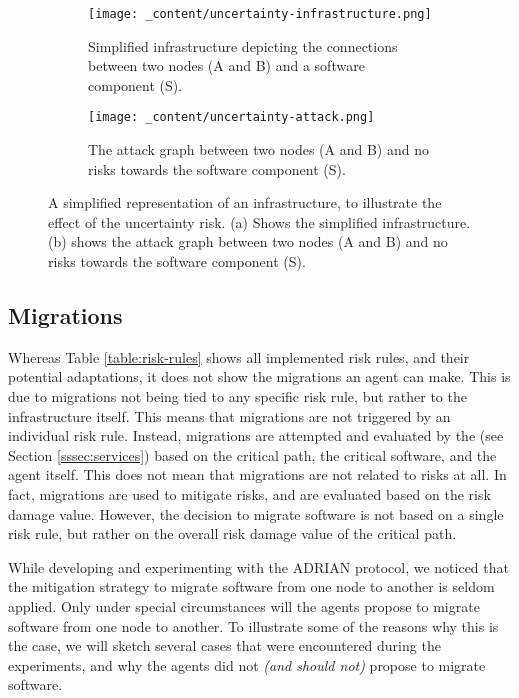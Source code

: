 \begin{figure}
    \begin{subfigure}[b]{0.47\textwidth}
        \centering
        \texttt{[image: \_content/uncertainty-infrastructure.png]}
        \caption{Simplified infrastructure depicting the connections between two nodes (A and B) and a software component (S).}
        \label{fig:uncertainty-infrastructure}
    \end{subfigure}
    \hfill
    \begin{subfigure}[b]{0.47\textwidth}
        \centering
        \texttt{[image: \_content/uncertainty-attack.png]}
        \caption{The attack graph between two nodes (A and B) and no risks towards the software component (S).}
        \label{fig:uncertainty-attack}
    \end{subfigure}
    \caption{A simplified representation of an infrastructure, to illustrate the effect of the uncertainty risk. (a) Shows the simplified infrastructure. (b) shows the attack graph between two nodes (A and B) and no risks towards the software component (S).}
    \label{fig:uncertainty}
\end{figure}

\subsection{Migrations} 
\label{ssec:migrations}
Whereas Table \ref{table:risk-rules} shows all implemented risk rules, and their potential adaptations, it does not show the migrations an agent can make. This is due to migrations not being tied to any specific risk rule, but rather to the infrastructure itself. This means that migrations are not triggered by an individual risk rule. Instead, migrations are attempted and evaluated by the  (see Section \ref{sssec:services}) based on the critical path, the critical software, and the agent itself. This does not mean that migrations are not related to risks at all. In fact, migrations are used to mitigate risks, and are evaluated based on the risk damage value. However, the decision to migrate software is not based on a single risk rule, but rather on the overall risk damage value of the critical path.

While developing and experimenting with the ADRIAN protocol, we noticed that the mitigation strategy to migrate software from one node to another is seldom applied. Only under special circumstances will the agents propose to migrate software from one node to another. To illustrate some of the reasons why this is the case, we will sketch several cases that were encountered during the experiments, and why the agents did not \emph{(and should not)} propose to migrate software.

